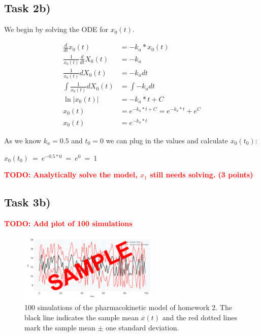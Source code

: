 \documentclass[]{scrartcl}
\begin{document}

\subsection*{Task 2b)}


We begin by solving the ODE for $x_0(t)$.

\begin{align*}
	\frac{d}{dt} x_0(t) &= - k_a * x_0(t) \\
	\frac{1}{x_0(t)} \frac{d}{dt} X_0(t) &= - k_a \\
	\frac{1}{x_0(t)} d X_0(t) &= - k_a dt \\
	\int \frac{1}{x_0(t)} d X_0(t) &= \int - k_a dt \\
	\ln \vert x_0(t) \vert &= - k_a * t + C \\
	x_0(t) &= e^{- k_a * t + C} = e^{- k_a * t} + e^C \\
	x_0(t) &= e^{- k_a * t}
\end{align*}

As we know $k_a = 0.5$ and $t_0 = 0$ we can plug in the values and calculate $x_0(t_0)$:

\begin{center}
	$x_0(t_0) ~ = ~ e^{- 0.5 * 0} ~ = ~ e^0 ~ = ~ 1$
\end{center}

\textbf{\textcolor{red}{TODO: Analytically solve the model, $x_1$ still needs solving. (3 points)}}


\clearpage
\subsection*{Task 3b)}

\textbf{\textcolor{red}{TODO: Add plot of 100 simulations}}

\begin{figure}[htbp!]
	\centering
	\includegraphics[width=0.6\textwidth]{Exercise3Homework3b.png}
	\caption{100 simulations of the pharmacokinetic model of homework 2.
			 The black line indicates the sample mean $\overline{x}(t)$ and the red dotted lines mark the sample mean $\pm$ one standard deviation.}
\end{figure}
\end{document}
